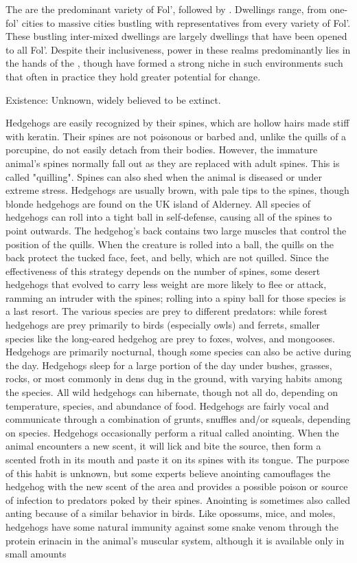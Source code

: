 \documentclass[twoside, 12pt, letterpaper]{report}\usepackage[]{graphicx}\usepackage[]{color}
\begin{document}
\begin{multicols*}{2}
The \mech are the predominant variety of Fol', followed by \mouse. Dwellings range, from one-fol' cities to massive cities bustling with representatives from every variety of Fol'. These bustling inter-mixed dwellings are largely \mech dwellings that have been opened to all Fol'. Despite their inclusiveness, power in these realms predominantly lies in the hands of the \mech, though \mouse have formed a strong niche in such environments such that often in practice they hold greater potential for change. 

\nsubsection{\rat}
Existence: Unknown, widely believed to be extinct.

\nsubsection{\mole}

\nsubsection{\hedgehog}
Hedgehogs are easily recognized by their spines, which are hollow hairs made stiff with keratin. Their spines are not poisonous or barbed and, unlike the quills of a porcupine, do not easily detach from their bodies. However, the immature animal's spines normally fall out as they are replaced with adult spines. This is called "quilling". Spines can also shed when the animal is diseased or under extreme stress. Hedgehogs are usually brown, with pale tips to the spines, though blonde hedgehogs are found on the UK island of Alderney. All species of hedgehogs can roll into a tight ball in self-defense, causing all of the spines to point outwards. The hedgehog's back contains two large muscles that control the position of the quills. When the creature is rolled into a ball, the quills on the back protect the tucked face, feet, and belly, which are not quilled. Since the effectiveness of this strategy depends on the number of spines, some desert hedgehogs that evolved to carry less weight are more likely to flee or attack, ramming an intruder with the spines; rolling into a spiny ball for those species is a last resort. The various species are prey to different predators: while forest hedgehogs are prey primarily to birds (especially owls) and ferrets, smaller species like the long-eared hedgehog are prey to foxes, wolves, and mongooses. Hedgehogs are primarily nocturnal, though some species can also be active during the day. Hedgehogs sleep for a large portion of the day under bushes, grasses, rocks, or most commonly in dens dug in the ground, with varying habits among the species. All wild hedgehogs can hibernate, though not all do, depending on temperature, species, and abundance of food. Hedgehogs are fairly vocal and communicate through a combination of grunts, snuffles and/or squeals, depending on species. Hedgehogs occasionally perform a ritual called anointing. When the animal encounters a new scent, it will lick and bite the source, then form a scented froth in its mouth and paste it on its spines with its tongue. The purpose of this habit is unknown, but some experts believe anointing camouflages the hedgehog with the new scent of the area and provides a possible poison or source of infection to predators poked by their spines. Anointing is sometimes also called anting because of a similar behavior in birds. Like opossums, mice, and moles, hedgehogs have some natural immunity against some snake venom through the protein erinacin in the animal's muscular system, although it is available only in small amounts 
\end{multicols*}
\end{document}
